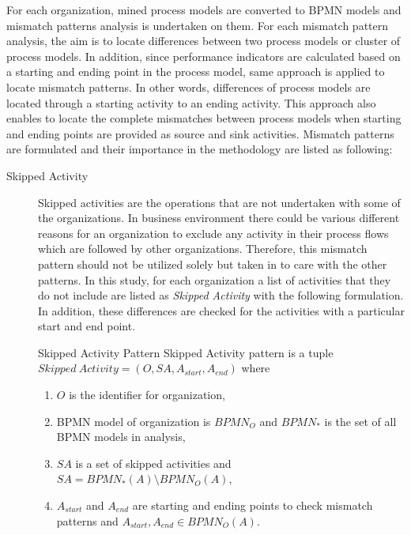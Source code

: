 For each organization, mined process models are converted to BPMN models and mismatch patterns analysis is undertaken on them. For each mismatch pattern analysis, the aim is to locate differences between two process models or cluster of process models. In addition, since performance indicators are calculated based on a starting and ending point in the process model, same approach is applied to locate mismatch patterns. In other words, differences of process models are located through a starting activity to an ending activity. This approach also enables to locate the complete mismatches between process models when starting and ending points are provided as source and sink activities. Mismatch patterns are formulated and their importance in the methodology are listed as following:
\begin{description}
  \item[Skipped Activity] Skipped activities are the operations that are not undertaken with some of the organizations. In business environment there could be various different reasons for an organization to exclude any activity in their process flows which are followed by other organizations. Therefore, this mismatch pattern should not be utilized solely but taken in to care with the other patterns. In this study, for each organization a list of activities that they do not include are listed as \textit{Skipped Activity} with the following formulation. In addition, these differences are checked for the activities with a particular start and end point. 
		\theoremstyle{definition}
		\begin{definition}{Skipped Activity Pattern}
		Skipped Activity pattern is a tuple ${Skipped\ Activity} = (O, SA, A_{start}, A_{end}) $ where 
		\begin{enumerate}
		  \item $O$ is the identifier for organization,
		  \item BPMN model of organization is $BPMN_{O}$ and $BPMN_{*}$ is the set of all BPMN models in analysis,
		  \item $SA$ is a set of skipped activities and $SA =  BPMN_{*}(A) \setminus BPMN_{O}(A)$,
		  \item $A_{start}$ and $A_{end}$ are starting and ending points to check mismatch patterns and $A_{start}, A_{end} \in BPMN_{O}(A)$.
		\end{enumerate}
		\end{definition}

\end{description}
